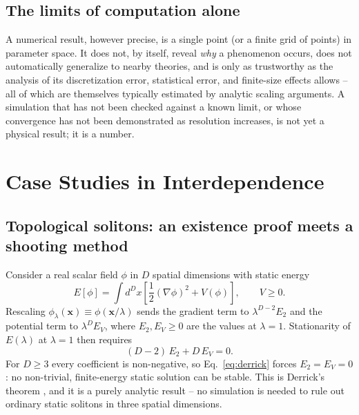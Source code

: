 \documentclass[11pt]{article}
\begin{document}
\subsection{The limits of computation alone}

A numerical result, however precise, is a single point (or a finite grid of points) in parameter space. It does not, by itself, reveal \emph{why} a phenomenon occurs, does not automatically generalize to nearby theories, and is only as trustworthy as the analysis of its discretization error, statistical error, and finite-size effects allows -- all of which are themselves typically estimated by analytic scaling arguments. A simulation that has not been checked against a known limit, or whose convergence has not been demonstrated as resolution increases, is not yet a physical result; it is a number.

\section{Case Studies in Interdependence}

\subsection{Topological solitons: an existence proof meets a shooting method}

Consider a real scalar field $\phi$ in $D$ spatial dimensions with static energy
\begin{equation}
E[\phi] = \int d^D x \left[ \frac{1}{2}(\nabla \phi)^2 + V(\phi) \right], \qquad V \geq 0.
\label{eq:scalar-energy}
\end{equation}
Rescaling $\phi_\lambda(\mathbf{x}) \equiv \phi(\mathbf{x}/\lambda)$ sends the gradient term to $\lambda^{D-2}E_2$ and the potential term to $\lambda^D E_V$, where $E_2, E_V \geq 0$ are the values at $\lambda=1$. Stationarity of $E(\lambda)$ at $\lambda=1$ then requires
\begin{equation}
(D-2)\,E_2 + D\,E_V = 0.
\label{eq:derrick}
\end{equation}
For $D \geq 3$ every coefficient is non-negative, so Eq.~\eqref{eq:derrick} forces $E_2 = E_V = 0$: no non-trivial, finite-energy static solution can be stable. This is Derrick's theorem \cite{Derrick1964}, and it is a purely analytic result -- no simulation is needed to rule out ordinary static solitons in three spatial dimensions.
\end{document}
